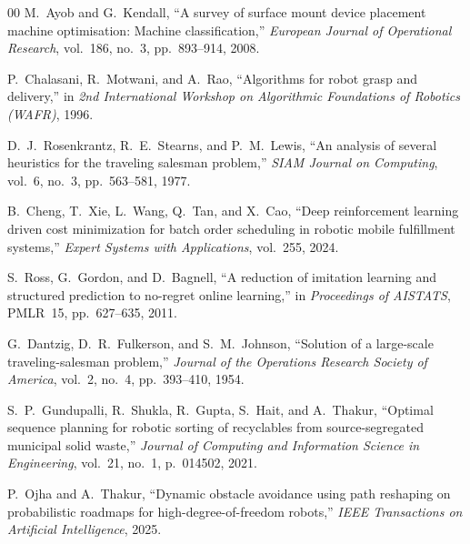 \documentclass[conference]{IEEEtran}
\begin{document}
\begin{thebibliography}{00}
 M.~Ayob and G.~Kendall, ``A survey of surface mount device placement machine optimisation: Machine classification,'' \emph{European Journal of Operational Research}, vol.~186, no.~3, pp.~893--914, 2008.

 P.~Chalasani, R.~Motwani, and A.~Rao, ``Algorithms for robot grasp and delivery,'' in \emph{2nd International Workshop on Algorithmic Foundations of Robotics (WAFR)}, 1996.

 D.~J.~Rosenkrantz, R.~E.~Stearns, and P.~M.~Lewis, ``An analysis of several heuristics for the traveling salesman problem,'' \emph{SIAM Journal on Computing}, vol.~6, no.~3, pp.~563--581, 1977.

 B.~Cheng, T.~Xie, L.~Wang, Q.~Tan, and X.~Cao, ``Deep reinforcement learning driven cost minimization for batch order scheduling in robotic mobile fulfillment systems,'' \emph{Expert Systems with Applications}, vol.~255, 2024.

 S.~Ross, G.~Gordon, and D.~Bagnell, ``A reduction of imitation learning and structured prediction to no-regret online learning,'' in \emph{Proceedings of AISTATS}, PMLR~15, pp.~627--635, 2011.

 G.~Dantzig, D.~R.~Fulkerson, and S.~M.~Johnson, ``Solution of a large-scale traveling-salesman problem,'' \emph{Journal of the Operations Research Society of America}, vol.~2, no.~4, pp.~393--410, 1954.

 S.~P.~Gundupalli, R.~Shukla, R.~Gupta, S.~Hait, and A.~Thakur, ``Optimal sequence planning for robotic sorting of recyclables from source-segregated municipal solid waste,'' \emph{Journal of Computing and Information Science in Engineering}, vol.~21, no.~1, p.~014502, 2021.

 P.~Ojha and A.~Thakur, ``Dynamic obstacle avoidance using path reshaping on probabilistic roadmaps for high-degree-of-freedom robots,'' \emph{IEEE Transactions on Artificial Intelligence}, 2025.

\end{thebibliography}
\end{document}
